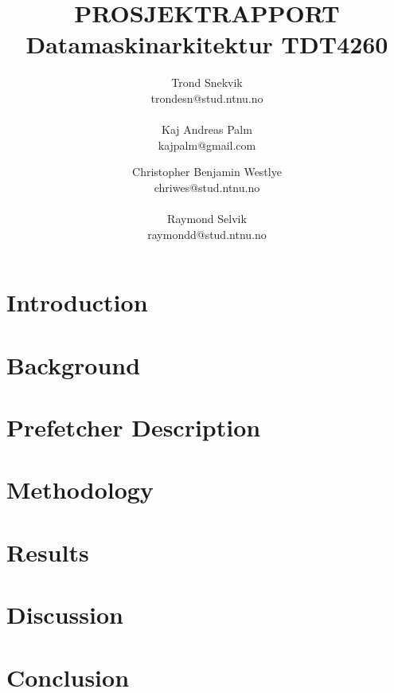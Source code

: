 \documentclass[a4paper]{report}
\author{Trond Snekvik\\ trondesn@stud.ntnu.no\\\\ Kaj Andreas Palm \\kajpalm@gmail.com\and Christopher Benjamin Westlye\\ chriwes@stud.ntnu.no\\\\ Raymond Selvik\\ raymondd@stud.ntnu.no}
\title{\MakeUppercase{\bf Prosjektrapport} \\ \Large{Datamaskinarkitektur TDT4260}}
\date{}
\begin{document}
\maketitle


\tableofcontents
\pagestyle{plain} %

\begin{abstract}

\end{abstract}

\newpage
\chapter{Introduction}


\newpage
\chapter{Background}


\newpage
\chapter{Prefetcher Description}


\newpage
\chapter{Methodology}


\newpage
\chapter{Results}


\newpage
\chapter{Discussion}


\newpage
\chapter{Conclusion}

\end{document}
